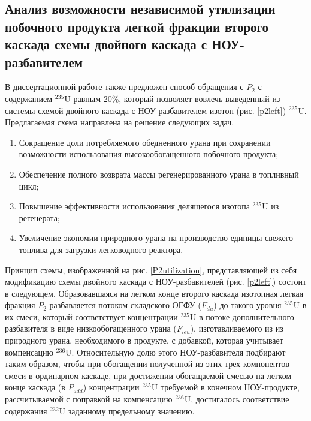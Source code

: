 \subsection{Анализ возможности независимой утилизации побочного продукта легкой фракции второго каскада схемы двойного каскада с НОУ-разбавителем}

В диссертационной работе также предложен способ обращения с $P_2$ с содержанием $^{235}$U равным 20\%, который позволяет вовлечь выведенный из системы схемой двойного каскада с НОУ-разбавителем изотоп (рис. \ref{p2left}) $^{235}$U. Предлагаемая схема направлена на решение следующих задач.

\begin{enumerate}
  \item Сокращение доли потребляемого обедненного урана при сохранении возможности использования высокообогащенного побочного продукта;
  \item Обеспечение полного возврата массы регенерированного урана в топливный цикл;
  \item Повышение эффективности использования делящегося изотопа $^{235}$U из регенерата;
  \item Увеличение экономии природного урана на производство единицы свежего топлива для загрузки легководного реактора.
\end{enumerate}

Принцип схемы, изображенной на рис. \ref{P2utilization}, представляющей из себя модификацию схемы двойного каскада с НОУ-разбавителей (рис. \ref{p2left}) состоит в следующем.
Образовавшаяся на легком конце второго каскада изотопная легкая фракция $P_2$  разбавляется потоком складского ОГФУ ($F_{du}$) до такого уровня $^{235}$U в их смеси, который соответствует концентрации $^{235}$U в потоке дополнительного разбавителя в виде низкообогащенного урана ($F_{leu}$), изготавливаемого из из природного урана. необходимого в продукте, с добавкой, которая учитывает компенсацию $^{236}$U. Относительную долю этого НОУ-разбавителя подбирают таким образом, чтобы при обогащении полученной из этих трех компонентов смеси в ординарном каскаде, при достижении обогащаемой смесью на легком конце каскада (в  $P_{add}$) концентрации $^{235}$U требуемой в конечном НОУ-продукте, рассчитываемой с поправкой на компенсацию $^{236}$U, достигалось соответствие содержания $^{232}$U заданному предельному значению.

